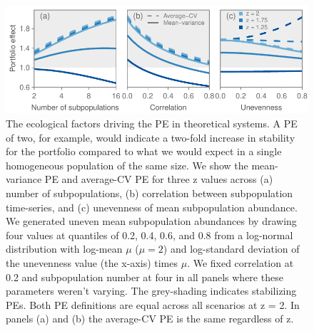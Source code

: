 \clearpage
\begin{figure}[htbp]
  \centering \includegraphics[width=4.8in]{prophets/fig2}
  \caption{
  The ecological factors driving the PE in theoretical systems. A PE of
    two, for example, would indicate a two-fold increase in stability for the
    portfolio compared to what we would expect in a single homogeneous
    population of the same size. We show the mean-variance PE and average-CV PE
    for three z values across (a) number of subpopulations, (b)
    correlation between subpopulation time-series, and (c) unevenness of mean
    subpopulation abundance. We generated uneven mean subpopulation abundances
    by drawing four values at quantiles of 0.2, 0.4, 0.6, and 0.8
    from a log-normal distribution
    with log-mean $\mu$ ($\mu = 2$) and log-standard deviation of the
    unevenness value (the x-axis) times $\mu$. We fixed correlation at 0.2 and subpopulation
    number at four in all panels where these parameters weren't varying. The
    grey-shading indicates stabilizing PEs. Both PE definitions are equal
    across all scenarios at z = 2. In panels (a) and (b) the average-CV PE is
    the same regardless of z.
  } \label{fig:lines}
\end{figure}


